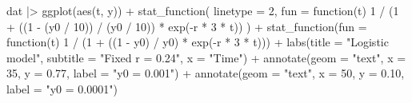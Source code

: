 \documentclass[
  letterpaper,
  DIV=11,
  numbers=noendperiod]{scrreprt}
\newenvironment{Shaded}{\begin{snugshade}}{\end{snugshade}}
\newcommand{\AttributeTok}[1]{\textcolor[rgb]{0.40,0.45,0.13}{#1}}
\newcommand{\ControlFlowTok}[1]{\textcolor[rgb]{0.00,0.23,0.31}{#1}}
\newcommand{\DecValTok}[1]{\textcolor[rgb]{0.68,0.00,0.00}{#1}}
\newcommand{\FloatTok}[1]{\textcolor[rgb]{0.68,0.00,0.00}{#1}}
\newcommand{\FunctionTok}[1]{\textcolor[rgb]{0.28,0.35,0.67}{#1}}
\newcommand{\NormalTok}[1]{\textcolor[rgb]{0.00,0.23,0.31}{#1}}
\newcommand{\SpecialCharTok}[1]{\textcolor[rgb]{0.37,0.37,0.37}{#1}}
\newcommand{\StringTok}[1]{\textcolor[rgb]{0.13,0.47,0.30}{#1}}
\begin{document}
\begin{Shaded}
\begin{Highlighting}[]
\NormalTok{dat }\SpecialCharTok{|\textgreater{}}
  \FunctionTok{ggplot}\NormalTok{(}\FunctionTok{aes}\NormalTok{(t, y)) }\SpecialCharTok{+}
  \FunctionTok{stat\_function}\NormalTok{(}
    \AttributeTok{linetype =} \DecValTok{2}\NormalTok{,}
    \AttributeTok{fun =} \ControlFlowTok{function}\NormalTok{(t) }\DecValTok{1} \SpecialCharTok{/}\NormalTok{ (}\DecValTok{1} \SpecialCharTok{+}\NormalTok{ ((}\DecValTok{1} \SpecialCharTok{{-}}\NormalTok{ (y0 }\SpecialCharTok{/} \DecValTok{10}\NormalTok{)) }\SpecialCharTok{/}\NormalTok{ (y0 }\SpecialCharTok{/} \DecValTok{10}\NormalTok{)) }\SpecialCharTok{*} \FunctionTok{exp}\NormalTok{(}\SpecialCharTok{{-}}\NormalTok{r }\SpecialCharTok{*} \DecValTok{3} \SpecialCharTok{*}\NormalTok{ t))}
\NormalTok{  ) }\SpecialCharTok{+}
  \FunctionTok{stat\_function}\NormalTok{(}\AttributeTok{fun =} \ControlFlowTok{function}\NormalTok{(t) }\DecValTok{1} \SpecialCharTok{/}\NormalTok{ (}\DecValTok{1} \SpecialCharTok{+}\NormalTok{ ((}\DecValTok{1} \SpecialCharTok{{-}}\NormalTok{ y0) }\SpecialCharTok{/}\NormalTok{ y0) }\SpecialCharTok{*} \FunctionTok{exp}\NormalTok{(}\SpecialCharTok{{-}}\NormalTok{r }\SpecialCharTok{*} \DecValTok{3} \SpecialCharTok{*}\NormalTok{ t))) }\SpecialCharTok{+}
  \FunctionTok{labs}\NormalTok{(}\AttributeTok{title =} \StringTok{"Logistic model"}\NormalTok{, }\AttributeTok{subtitle =} \StringTok{"Fixed r = 0.24"}\NormalTok{, }\AttributeTok{x =} \StringTok{"Time"}\NormalTok{) }\SpecialCharTok{+}
  \FunctionTok{annotate}\NormalTok{(}\AttributeTok{geom =} \StringTok{"text"}\NormalTok{, }\AttributeTok{x =} \DecValTok{35}\NormalTok{, }\AttributeTok{y =} \FloatTok{0.77}\NormalTok{, }\AttributeTok{label =} \StringTok{"y0 = 0.001"}\NormalTok{) }\SpecialCharTok{+}
  \FunctionTok{annotate}\NormalTok{(}\AttributeTok{geom =} \StringTok{"text"}\NormalTok{, }\AttributeTok{x =} \DecValTok{50}\NormalTok{, }\AttributeTok{y =} \FloatTok{0.10}\NormalTok{, }\AttributeTok{label =} \StringTok{"y0 = 0.0001"}\NormalTok{)}
\end{Highlighting}
\end{Shaded}
\end{document}
